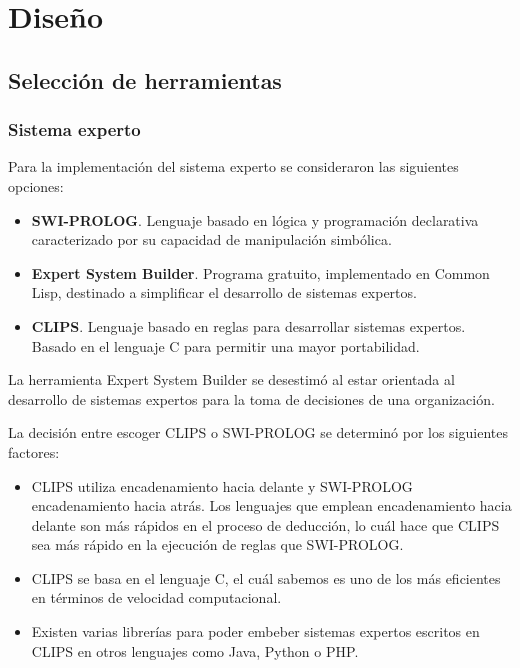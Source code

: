 \chapter{Diseño}

\section{Selección de herramientas}

\subsection{Sistema experto}

Para la implementación del sistema experto se consideraron las siguientes opciones:

\begin{itemize}

	\item \textbf{SWI-PROLOG}. Lenguaje basado en lógica y programación declarativa caracterizado por su capacidad de manipulación simbólica.

	\item \textbf{Expert System Builder}. Programa gratuito, implementado en Common Lisp, destinado a simplificar el desarrollo de sistemas expertos.

	\item \textbf{CLIPS}. Lenguaje basado en reglas para desarrollar sistemas expertos. Basado en el lenguaje C para permitir una mayor portabilidad. 

\end{itemize} 

La herramienta Expert System Builder se desestimó al estar orientada al desarrollo de sistemas expertos para la toma de decisiones de una organización. 

La decisión entre escoger CLIPS o SWI-PROLOG se determinó por los siguientes factores:

\begin{itemize}

	\item CLIPS utiliza encadenamiento hacia delante y SWI-PROLOG encadenamiento hacia atrás. Los lenguajes que emplean encadenamiento hacia delante son más rápidos en el proceso de deducción, lo cuál hace que CLIPS sea más rápido en la ejecución de reglas que SWI-PROLOG.

	\item CLIPS se basa en el lenguaje C, el cuál sabemos es uno de los más eficientes en términos de velocidad computacional.

	\item Existen varias librerías para poder embeber sistemas expertos escritos en CLIPS en otros lenguajes como Java, Python o PHP.

\end{itemize} 

